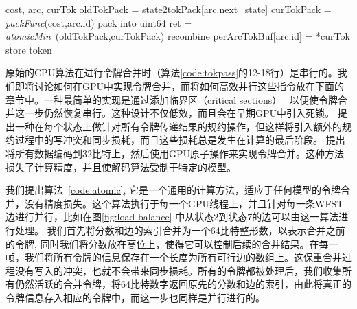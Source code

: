 \begin{algorithm}[ht]
\caption{线程级别的令牌合并算法 \textcolor[rgb]{0,0.5,0}{(Inputs: accumulated cost, an out-going WFST arc and a current token)}}
\label{code:atomic}
\begin{algorithmic}[1]
 {cost, arc, curTok}
\State oldTokPack = state2tokPack[arc.next\_state]
\State curTokPack = \textit{packFunc}(cost,arc.id) \Comment \textcolor[rgb]{0,0.5,0}{pack into uint64}
\State ret = \textit{atomicMin}~\footnotemark(oldTokPack,curTokPack)
         \Comment \textcolor[rgb]{0,0.5,0}{recombine}
\State  perArcTokBuf[arc.id] = *curTok \Comment \textcolor[rgb]{0,0.5,0}{store token}
\EndIf
\EndProcedure
\end{algorithmic}
\end{algorithm}


原始的CPU算法在进行令牌合并时（算法\ref{code:tokpass}的12-18行）是串行的。我们即将讨论如何在GPU中实现令牌合并，而将如何高效并行这些指令放在下面的章节中。一种最简单的实现是通过添加临界区（critical sections）~\cite{lamport1979make}
以便使令牌合并这一步仍然恢复串行。这种设计不仅低效，而且会在早期GPU中引入死锁。
\cite{you2009parallel} 提出一种在每个状态上做针对所有令牌传递结果的规约操作，但这样将引入额外的规约过程中的写冲突和同步损耗，而且这些损耗总是发生在计算的最后阶段。
%
\cite{kim2011h} 提出将所有数据编码到32比特上，然后使用GPU原子操作来实现令牌合并。这种方法损失了计算精度，并且使解码算法受制于特定的模型。

我们提出算法~\ref{code:atomic}, 它是一个通用的计算方法，适应于任何模型的令牌合并，没有精度损失。这个算法执行于每一个GPU线程上，并且针对每一条WFST边进行并行，比如在图\ref{fig:load-balance} 中从状态2到状态7的边可以由这一算法进行处理。
我们首先将分数和边的索引合并为一个64比特整形数，以表示合并之前的令牌, 同时我们将分数放在高位上，使得它可以控制后续的合并结果。在每一帧，我们将所有令牌的信息保存在一个长度为所有可行边的数组上。这保重合并过程没有写入的冲突，也就不会带来同步损耗。所有的令牌都被处理后，我们收集所有仍然活跃的合并令牌，将64比特数字返回原先的分数和边的索引，由此将真正的令牌信息存入相应的令牌中，而这一步也同样是并行进行的。


